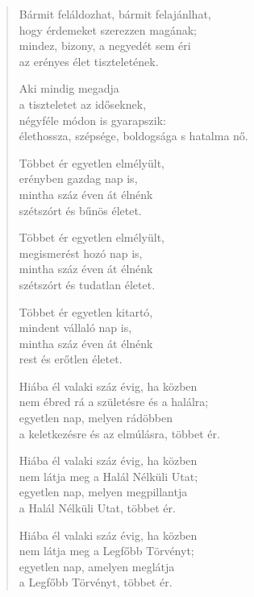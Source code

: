 \begin{verse}
 Bármit feláldozhat, bármit felajánlhat,\\
hogy érdemeket szerezzen magának;\\
mindez, bizony, a negyedét sem éri\\
az erényes élet tiszteletének.

 Aki mindig megadja\\
a tiszteletet az időseknek,\\
négyféle módon is gyarapszik:\\
élethossza, szépsége, boldogsága s hatalma nő.

 Többet ér egyetlen elmélyült,\\
erényben gazdag nap is,\\
mintha száz éven át élnénk\\
szétszórt és bűnös életet.

 Többet ér egyetlen elmélyült,\\
megismerést hozó nap is,\\
mintha száz éven át élnénk\\
szétszórt és tudatlan életet.

 Többet ér egyetlen kitartó,\\
mindent vállaló nap is,\\
mintha száz éven át élnénk\\
rest és erőtlen életet.

 Hiába él valaki száz évig, ha közben\\
nem ébred rá a születésre és a halálra;\\
egyetlen nap, melyen rádöbben\\
a keletkezésre és az elmúlásra, többet ér.

 Hiába él valaki száz évig, ha közben\\
nem látja meg a Halál Nélküli Utat;\\
egyetlen nap, melyen megpillantja\\
a Halál Nélküli Utat, többet ér.

 Hiába él valaki száz évig, ha közben\\
nem látja meg a Legfőbb Törvényt;\\
egyetlen nap, amelyen meglátja\\
a Legfőbb Törvényt, többet ér.

\end{verse}

